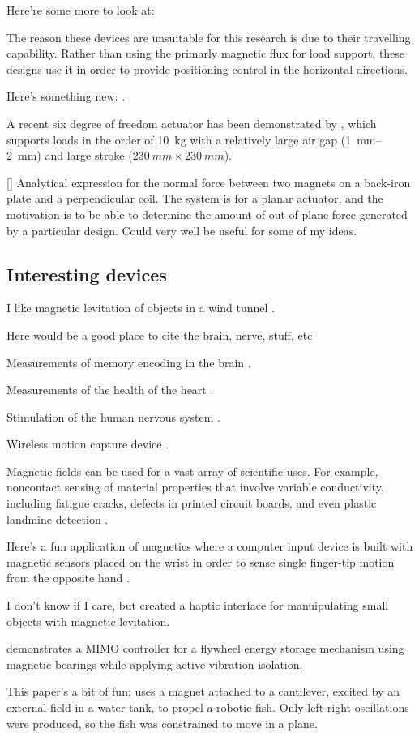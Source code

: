 Here're some more to look at: \textcite{boeij2008,zhang2008a}

The reason these devices are unsuitable for this research is due to their
travelling capability.
Rather than using the primarly magnetic flux for load
support, these designs use it in order to provide positioning control in the
horizontal directions.

Here's something new: \textcite{shameli2008}.

A recent six degree of freedom actuator has been demonstrated
by \textcite{jansen2008}, which supports loads in the order of
\SI{10}{kg} with a relatively large air gap (\SI{1}{mm}--\SI{2}{mm}) 
and large stroke ($\SI{230}{mm}\times\SI{230}{mm}$).

[\textcite{dasilveira2005}] Analytical expression for the normal force
between two magnets on a back-iron plate and a perpendicular coil.
The system
is for a planar actuator, and the motivation is to be able to determine the
amount of out-of-plane force generated by a particular design.
Could very well
be useful for some of my ideas.

\subsection{Interesting devices}


I like magnetic levitation of objects in a wind tunnel \cite{higuchi2008}.

Here would be a good place to cite the brain, nerve, stuff, etc
\parencite{sekino2005,lu2008,demachi2008}

Measurements of memory encoding in the brain \cite{gjini2005}.

Measurements of the health of the heart \cite{lim2009}.

Stimulation of the human nervous system \cite{darabant2009}.

Wireless motion capture device \cite{hashi2005}.

Magnetic fields can be used for a vast array of scientific uses.
For example,
noncontact sensing of material properties that involve variable conductivity,
including fatigue cracks, defects in printed circuit boards, and even plastic
landmine detection \cite{mukhopadhyay2005}.

Here's a fun application of magnetics where a computer input device is built
with magnetic sensors placed on the wrist in order to sense single finger-tip
motion from the opposite hand \parencite{han2008}.

I don't know if I care, but \textcite{vanwest2007} created a haptic interface for manuipulating small objects with magnetic levitation.

\textcite{park2008} demonstrates a MIMO controller for a flywheel energy
storage mechanism using magnetic bearings while applying active vibration
isolation.

\textcite{tomie2005} This paper's a bit of fun; uses a magnet attached to a cantilever, excited by an external field in a water tank, to propel a robotic fish.
Only left-right oscillations were produced, so the fish was constrained to move in a plane.




